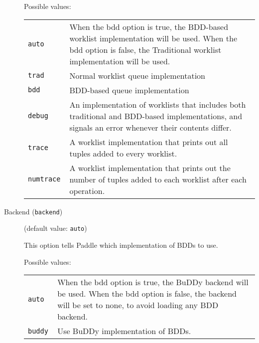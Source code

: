 \documentclass{article}
\begin{document}
\begin{description}
Possible values:\\
\begin{longtable}{p{1in}p{4in}}

{\tt auto }
&

When the bdd option is true, the BDD-based worklist implementation will be used.
When the bdd option is false, the Traditional worklist implementation will be used.
\\

{\tt trad }
&

Normal worklist queue implementation
\\

{\tt bdd }
&

BDD-based queue implementation
\\

{\tt debug }
&

An implementation of worklists that includes both traditional and BDD-based
implementations, and signals an error whenever their contents differ.
\\

{\tt trace }
&

A worklist implementation that prints out all tuples added to every worklist.
\\

{\tt numtrace }
&

A worklist implementation that prints out the number of tuples added to
each worklist after each operation.
\\

\end{longtable}


\item[Backend ({\tt backend})]
(default value: {\tt auto})




This option tells Paddle which implementation of BDDs to use.
        



Possible values:\\
\begin{longtable}{p{1in}p{4in}}

{\tt auto }
&

When the bdd option is true, the BuDDy backend will be used.
When the bdd option is false, the backend will be set to none, to avoid
loading any BDD backend.
\\

{\tt buddy }
&

Use BuDDy implementation of BDDs.
\\


\end{longtable}
\end{description}
\end{document}
